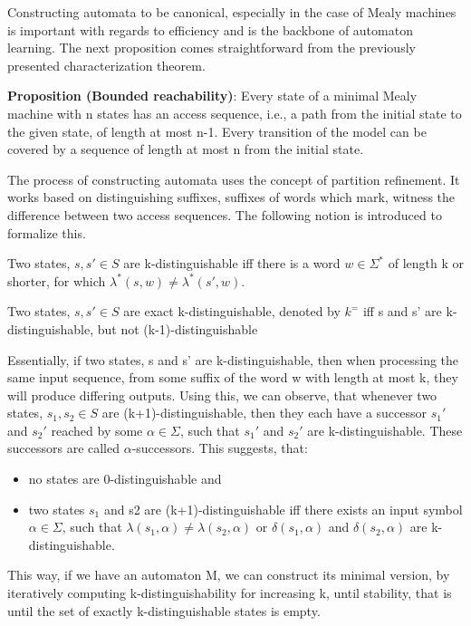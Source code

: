 Constructing automata to be canonical, especially in the case of Mealy machines is important with regards to efficiency and is the backbone of automaton learning. The next proposition comes straightforward from the previously presented characterization theorem.


\noindent \textbf{Proposition (Bounded reachability\cite{Steffen2011})}: Every state of a minimal Mealy machine with n states has an access sequence, i.e., a path from the initial state to the given state,  of  length  at  most n-1.  Every  transition  of the model can be covered by a sequence of length at most n from the initial state.

The process of constructing automata uses the concept of partition refinement. It works based on distinguishing suffixes, suffixes of words which mark, witness the difference between two access sequences. The following notion is introduced to formalize this.


\begin{definition}
	Two states, $s,s'\in S$ are k-distinguishable iff there is a word $w\in\Sigma^*$ of length k or shorter, for which $\lambda^*(s, w)\neq\lambda^*(s',w)$.
\end{definition} 

\begin{definition}
	Two states, $s,s'\in S$ are exact k-distinguishable, denoted by $k^=$ iff s and s' are k-distinguishable, but not (k-1)-distinguishable
\end{definition}

Essentially, if two states, s and s' are  k-distinguishable, then when processing the same input sequence, from some suffix of the word w with length at most k, they will produce differing outputs. Using this, we can observe, that whenever two states, $s_1, s_2\in S$ are (k+1)-distinguishable, then they each have a successor $s_1'$ and $s_2'$ reached by some $\alpha\in\Sigma$, such that $s_1'$ and $s_2'$ are k-distinguishable. These successors are called $\alpha$-successors. This suggests, that:
\begin{itemize}
	\item no states are 0-distinguishable and
	\item two states $s_1$ and s2 are (k+1)-distinguishable iff there exists an input symbol $\alpha\in\Sigma$, such that $\lambda(s_1, \alpha) \neq \lambda(s_2,\alpha)$ or $\delta(s_1, \alpha)$ and $\delta(s_2, \alpha)$ are k-distinguishable.\cite{Steffen2011}
\end{itemize}
This way, if we have an automaton M, we can construct its minimal version, by iteratively computing k-distinguishability for increasing k, until stability, that is until the set of exactly k-distinguishable states is empty.

